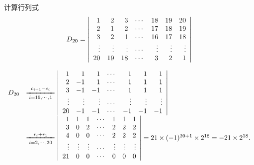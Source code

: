 \begin{li}
  计算行列式
  $$
  D_{20} = \left|
    \begin{array}{rrrrrrr}
      1   & 2    & 3    & \cdots  & 18    & 19    &  20 \\ 
      2   & 1    & 2    & \cdots  & 17    & 18    &  19 \\
      3   & 2    & 1    & \cdots  & 16    & 17    &  18 \\
      \vdots & \vdots  & \vdots  & \cdots  & \vdots   & \vdots   &  \vdots \\
      20  & 19   & 18   & \cdots  & 3     & 2     &  1
    \end{array}
  \right|
  $$    
\end{li}
\begin{jie}
  $$
  \begin{array}{ll}
    D_{20} &   \xlongequal[i=19,\cd,1]{c_{i+1}-c_i} 
             \left|
             \begin{array}{rrrrrrr}
               1   & 1    & 1    & \cd  & 1    & 1    &  1 \\ 
               2   & -1   & 1    & \cd  & 1    & 1    &  1 \\
               3   & -1   & -1   & \cd  & 1    & 1    &  1 \\
               \vd & \vd  & \vd  & \cd  & \vd  & \vd  &  \vd \\
               20  & -1   & -1   & \cd  & -1   & -1   &  -1
             \end{array}
                                                        \right| \\[0.5cm]
           & \xlongequal[i=2,\cd,20]{r_i+r_1} 
             \left|
             \begin{array}{rrrrrrr}
               1   & 1    & 1    & \cd  & 1    & 1    &  1 \\ 
               3   & 0    & 2    & \cd  & 2    & 2    &  2 \\
               4   & 0    & 0    & \cd  & 2    & 2    &  2 \\
               \vd & \vd  & \vd  & \cd  & \vd  & \vd  &  \vd \\
               21  & 0    & 0    & \cd  & 0    & 0    &  0
             \end{array}
                                                        \right|
                                                        = 21 \times (-1)^{20+1} \times 2^{18} = -21 \times 2^{18}.
  \end{array}
  $$

\end{jie}


